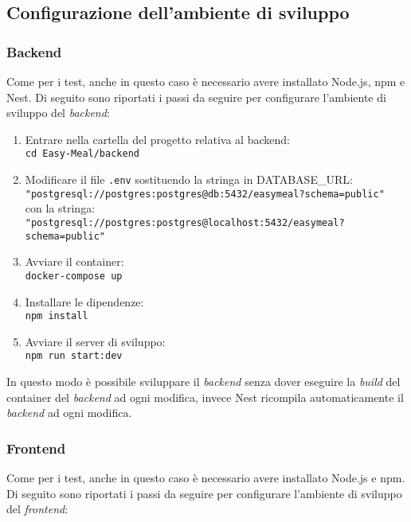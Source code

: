 \subsection{Configurazione dell'ambiente di sviluppo}


\subsubsection{Backend}
Come per i test, anche in questo caso è necessario avere installato Node.js, npm e Nest.
Di seguito sono riportati i passi da seguire per configurare l'ambiente di sviluppo del \textit{backend}:
\begin{enumerate}
	\item Entrare nella cartella del progetto relativa al backend: \\
		\texttt{cd Easy-Meal/backend}
	\item Modificare il file \texttt{.env} sostituendo la stringa in DATABASE\_URL: \\
		\texttt{"postgresql://postgres:postgres@db:5432/easymeal?schema=public"}\\
		con la stringa: \\
		\texttt{"postgresql://postgres:postgres@localhost:5432/easymeal?schema=public"}
	\item Avviare il container: \\
		\texttt{docker-compose up}
	\item Installare le dipendenze: \\
		\texttt{npm install}
	\item Avviare il server di sviluppo: \\
		\texttt{npm run start:dev}
\end{enumerate}
In questo modo è possibile sviluppare il \textit{backend} senza dover eseguire
la \textit{build} del container del \textit{backend} ad ogni modifica, invece
Nest ricompila automaticamente il \textit{backend} ad ogni modifica.


\subsubsection{Frontend}
Come per i test, anche in questo caso è necessario avere installato Node.js e
npm.
Di seguito sono riportati i passi da seguire per configurare l'ambiente di
sviluppo del \textit{frontend}:

